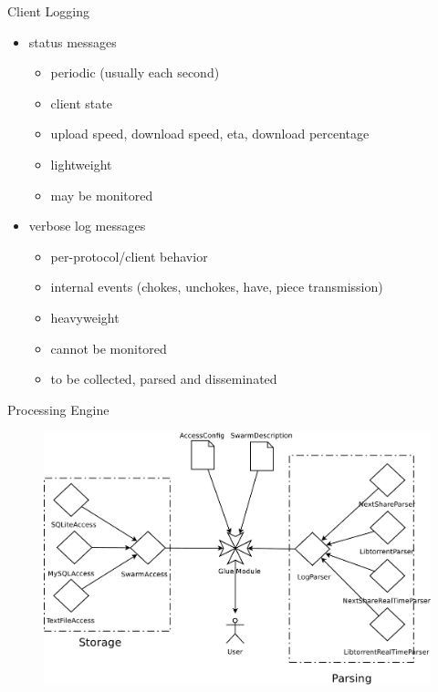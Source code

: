\documentclass{beamer}
\begin{document}
\begin{frame}{Client Logging}
  \begin{itemize}
    \item status messages
      \begin{itemize}
        \item periodic (usually each second)
        \item client state
        \item upload speed, download speed, eta, download percentage
        \item lightweight
        \item may be monitored
      \end{itemize}
    \item verbose log messages
      \begin{itemize}
        \item per-protocol/client behavior
        \item internal events (chokes, unchokes, have, piece transmission)
        \item heavyweight
        \item cannot be monitored
        \item to be collected, parsed and disseminated
      \end{itemize}
  \end{itemize}
\end{frame}

\begin{frame}{Processing Engine}
  \begin{figure}
    \includegraphics[scale=0.17]{img/ppf-architecture}
  \end{figure}
\end{frame}
\end{document}
